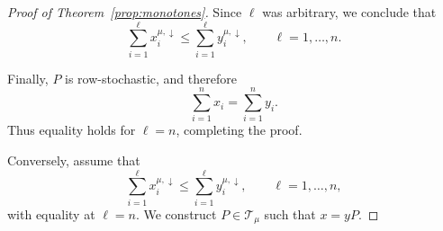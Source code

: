 \documentclass[11pt,a4paper,longbibliography]{amsart}
\numberwithin{equation}{section}
\theoremstyle{plain}
\theoremstyle{definition}
\theoremstyle{remark}
\begin{document}
\begin{proof}[Proof of Theorem~\ref{prop:monotones}]
				Since $\ell$ was arbitrary, we conclude that
				$$
				\sum_{i=1}^{\ell}x_i^{\mu,\downarrow}
				\le
				\sum_{i=1}^{\ell}y_i^{\mu,\downarrow},
				\qquad
				\ell=1,\ldots,n.
				$$
				
				Finally, $P$ is row-stochastic, and therefore
				$$
				\sum_{i=1}^n x_i
				=
				\sum_{i=1}^n y_i.
				$$
				Thus equality holds for $\ell=n$, completing the proof.
				
				
				Conversely, assume that
				\begin{equation}\label{eq:InequalitiesProof}
					\sum_{i=1}^\ell x_i^{\mu,\downarrow}
					\le
					\sum_{i=1}^\ell y_i^{\mu,\downarrow},
					\qquad
					\ell=1,\ldots,n,
				\end{equation}
				with equality at $\ell=n$. 
				We construct $P\in\mathcal T_\mu$ such that $x=yP$.
				

\end{proof}
\end{document}
